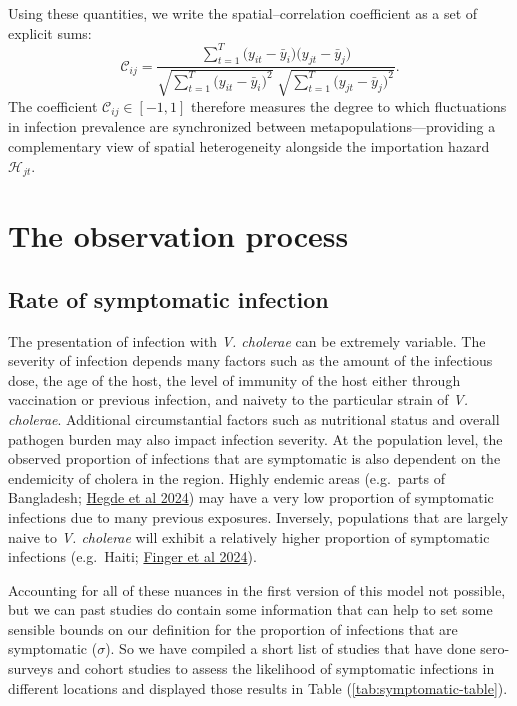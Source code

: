 \documentclass[
]{book}
\begin{document}
Using these quantities, we write the spatial--correlation coefficient as a set of explicit sums:
\begin{equation}
\mathcal{C}_{ij} = 
\frac{ \sum_{t=1}^{T}\bigl(y_{it}-\bar y_i\bigr)\bigl(y_{jt}-\bar y_j\bigr) }
     { \sqrt{\sum_{t=1}^{T}\bigl(y_{it}-\bar y_i\bigr)^{2}}
       \;\sqrt{\sum_{t=1}^{T}\bigl(y_{jt}-\bar y_j\bigr)^{2}} }.
\label{eq:correlation}
\end{equation}
The coefficient \(\mathcal{C}_{ij}\in[-1,1]\) therefore measures the degree to which fluctuations in infection prevalence are synchronized between metapopulations---providing a complementary view of spatial heterogeneity alongside the importation hazard \(\mathcal{H}_{jt}\).

\section{The observation process}\label{the-observation-process}

\subsection{Rate of symptomatic infection}\label{rate-of-symptomatic-infection}

The presentation of infection with \emph{V. cholerae} can be extremely variable. The severity of infection depends many factors such as the amount of the infectious dose, the age of the host, the level of immunity of the host either through vaccination or previous infection, and naivety to the particular strain of \emph{V. cholerae}. Additional circumstantial factors such as nutritional status and overall pathogen burden may also impact infection severity. At the population level, the observed proportion of infections that are symptomatic is also dependent on the endemicity of cholera in the region. Highly endemic areas (e.g.~parts of Bangladesh; \href{https://www.nature.com/articles/s41591-024-02810-4}{Hegde et al 2024}) may have a very low proportion of symptomatic infections due to many previous exposures. Inversely, populations that are largely naive to \emph{V. cholerae} will exhibit a relatively higher proportion of symptomatic infections (e.g.~Haiti; \href{https://www.ncbi.nlm.nih.gov/pmc/articles/PMC10635253/}{Finger et al 2024}).

Accounting for all of these nuances in the first version of this model not possible, but we can past studies do contain some information that can help to set some sensible bounds on our definition for the proportion of infections that are symptomatic (\(\sigma\)). So we have compiled a short list of studies that have done sero-surveys and cohort studies to assess the likelihood of symptomatic infections in different locations and displayed those results in Table (\ref{tab:symptomatic-table}).
\end{document}
